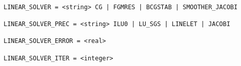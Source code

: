 \documentclass[../main.tex]{subfiles}
\begin{document}
 

\begin{verbatim}

LINEAR_SOLVER = <string> CG | FGMRES | BCGSTAB | SMOOTHER_JACOBI

LINEAR_SOLVER_PREC = <string> ILU0 | LU_SGS | LINELET | JACOBI

LINEAR_SOLVER_ERROR = <real> 

LINEAR_SOLVER_ITER = <integer>

\end{verbatim}
\end{document}
